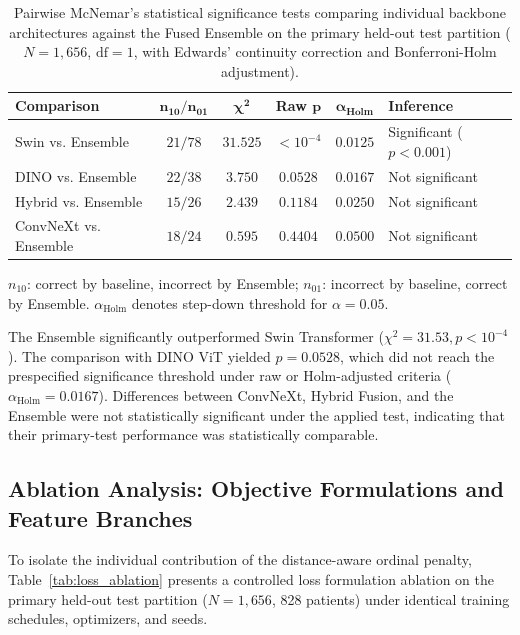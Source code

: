 \documentclass[10pt,journal]{IEEEtran}
\begin{document}
\begin{table}[!t]
\centering
\caption{Pairwise McNemar's statistical significance tests comparing individual backbone architectures against the Fused Ensemble on the primary held-out test partition ($N=1{,}656$, $\text{df} = 1$, with Edwards' continuity correction and Bonferroni-Holm adjustment).}
\label{tab:mcnemar}
\scriptsize
\setlength{\tabcolsep}{3pt}
\renewcommand{\arraystretch}{1.1}
\begin{tabularx}{\columnwidth}{@{}p{}ccccX@{}}
\toprule
\textbf{Comparison} & $\bm{n_{10}/n_{01}}$ & $\bm{\chi^2}$ & \textbf{Raw} $\bm{p}$ & $\bm{\alpha_{\text{Holm}}}$ & \textbf{Inference} \\
\midrule
Swin vs. Ensemble & $21/78$ & $31.525$ & $<10^{-4}$ & $0.0125$ & Significant ($p < 0.001$) \\
DINO vs. Ensemble & $22/38$ & $3.750$ & $0.0528$ & $0.0167$ & Not significant \\
Hybrid vs. Ensemble & $15/26$ & $2.439$ & $0.1184$ & $0.0250$ & Not significant \\
ConvNeXt vs. Ensemble & $18/24$ & $0.595$ & $0.4404$ & $0.0500$ & Not significant \\
\bottomrule
\end{tabularx}
\vspace{2pt}
\parbox{\columnwidth}{\footnotesize $n_{10}$: correct by baseline, incorrect by Ensemble; $n_{01}$: incorrect by baseline, correct by Ensemble. $\alpha_{\text{Holm}}$ denotes step-down threshold for $\alpha = 0.05$.}
\end{table}

The Ensemble significantly outperformed Swin Transformer ($\chi^2 = 31.53, p < 10^{-4}$). The comparison with DINO ViT yielded $p = 0.0528$, which did not reach the prespecified significance threshold under raw or Holm-adjusted criteria ($\alpha_{\text{Holm}} = 0.0167$). Differences between ConvNeXt, Hybrid Fusion, and the Ensemble were not statistically significant under the applied test, indicating that their primary-test performance was statistically comparable.

\subsection{Ablation Analysis: Objective Formulations and Feature Branches}
\label{subsec:ablation}

To isolate the individual contribution of the distance-aware ordinal penalty, Table~\ref{tab:loss_ablation} presents a controlled loss formulation ablation on the primary held-out test partition ($N = 1{,}656$, 828 patients) under identical training schedules, optimizers, and seeds.
\end{document}

